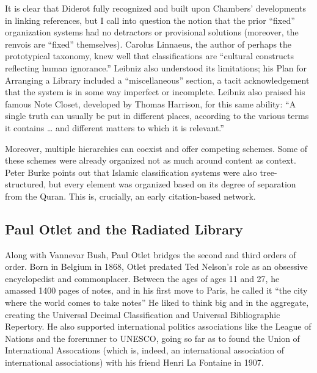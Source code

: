 It is clear that Diderot fully recognized and built upon Chambers’ developments in linking references, but I call into question the notion that the prior “fixed” organization systems had no detractors or provisional solutions (moreover, the renvois are “fixed” themselves). Carolus Linnaeus, the author of perhaps the prototypical taxonomy, knew well that classifications are “cultural constructs reflecting human ignorance.”  Leibniz also understood its limitations; his Plan for Arranging a Library included a “miscellaneous” section, a tacit acknowledgement that the system is in some way imperfect or incomplete. Leibniz also praised his famous Note Closet, developed by Thomas Harrison, for this same ability: “A single truth can usually be put in different places, according to the various terms it contains … and different matters to which it is relevant.” 

Moreover, multiple hierarchies can coexist and offer competing schemes. Some of these schemes were already organized not as much around content as context. Peter Burke points out that Islamic classification systems were also tree-structured, but every element was organized based on its degree of separation from the Quran.  This is, crucially, an early citation-based network.

\subsection{Paul Otlet and the Radiated Library}

Along with Vannevar Bush, Paul Otlet bridges the second and third orders of order. Born in Belgium in 1868, Otlet predated Ted Nelson’s role as an obsessive encyclopedist and commonplacer. Between the ages of ages 11 and 27, he amassed 1400 pages of notes, and in his first move to Paris, he called it “the city where the world comes to take notes”  He liked to think big and in the aggregate, creating the Universal Decimal Classification and Universal Bibliographic Repertory. He also supported international politics associations like the League of Nations and the forerunner to UNESCO, going so far as to found the Union of International Assocations (which is, indeed, an international association of international associations) with his friend Henri La Fontaine in 1907.

